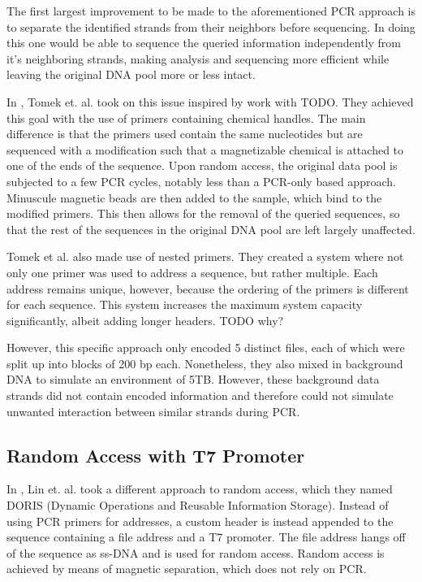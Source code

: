 \documentclass[a4paper,conference]{IEEEtran}
\begin{document}
The first largest improvement to be made to the aforementioned PCR approach is to separate the identified strands from their neighbors before sequencing. In doing this one would be able to sequence the queried information independently from it's neighboring strands, making analysis and sequencing more efficient while leaving the original DNA pool more or less intact.

In \cite{}, Tomek et. al. took on this issue inspired by \cite{} work with TODO. They achieved this goal with the use of primers containing chemical handles. The main difference is that the primers used contain the same nucleotides but are sequenced with a modification such that a magnetizable chemical is attached to one of the ends of the sequence. Upon random access, the original data pool is subjected to a few PCR cycles, notably less than a PCR-only based approach. Minuscule magnetic beads are then added to the sample, which bind to the modified primers. This then allows for the removal of the queried sequences, so that the rest of the sequences in the original DNA pool are left largely unaffected.

Tomek et al. also made use of nested primers. They created a system where not only one primer was used to address a sequence, but rather multiple. Each address remains unique, however, because the ordering of the primers is different for each sequence. This system increases the maximum system capacity significantly, albeit adding longer headers. TODO why?

However, this specific approach only encoded 5 distinct files, each of which were split up into blocks of 200 bp each. Nonetheless, they also mixed in background DNA to simulate an environment of 5TB. However, these background data strands did not contain encoded information and therefore could not simulate unwanted interaction between similar strands during PCR.

\subsection{Random Access with T7 Promoter}
In \cite{}, Lin et. al. took a different approach to random access, which they named DORIS (Dynamic Operations and Reusable Information Storage). Instead of using PCR primers for addresses, a custom header is instead appended to the sequence containing a file address and a T7 promoter. The file address hangs off of the sequence as ss-DNA and is used for random access. Random access is achieved by means of magnetic separation, which does not rely on PCR. 
\end{document}
